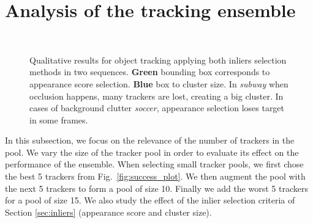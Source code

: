 

\section{Analysis of the tracking ensemble}
\begin{figure}[b!]
\centering
	 \\
	\hspace{0.05cm}
\vspace{-2mm}
\caption[Qualitative results for object tracking applying both inliers selection
	methods
	in two sequences.]{\small Qualitative results for object tracking applying both inliers selection methods in two sequences. \textbf{Green} bounding box corresponds to
	appearance score selection. \textbf{Blue} box to cluster size. In
	\textit{subway} when occlusion happens, many trackers are lost, creating a
	big cluster. In cases of background clutter \textit{soccer}, appearance
	selection loses target in some frames.}
\label{fig::clustvsapp}
\end{figure}


In this subsection, we focus on the relevance of the number of trackers in the pool.
We vary the size of the tracker pool in order to evaluate its effect on the
performance of the ensemble.
When selecting small tracker pools, we first chose the best 5 trackers
from Fig.~\ref{fig:success_plot}. We then augment the pool with the next 5 trackers to
form a pool of size 10. Finally we add the worst 5 trackers for a pool of size 15.
We also study the effect of the inlier selection criteria of Section
\ref{sec:inliers}
(appearance score and cluster size).

